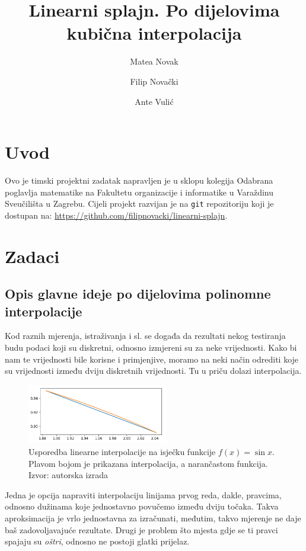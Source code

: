 \documentclass[12pt,a4paper]{report}
\author{Matea Novak \and Filip Novački \and Ante Vulić}
\title{Linearni splajn. Po dijelovima kubična interpolacija}
\begin{document}
	\maketitle
	
	\tableofcontents
	
\chapter{Uvod}
	Ovo je timski projektni zadatak napravljen je u sklopu kolegija Odabrana poglavlja matematike na Fakultetu organizacije i informatike u Varaždinu Sveučilišta u Zagrebu. Cijeli projekt razvijan je na \texttt{git} repozitoriju koji je dostupan na: \url{https://github.com/filipnovacki/linearni-splajn}. 
\chapter{Zadaci}
	\section{Opis glavne ideje po dijelovima polinomne interpolacije}
	Kod raznih mjerenja, istraživanja i sl. se događa da rezultati nekog testiranja budu podaci koji su diskretni, odnosno izmjereni su za neke vrijednosti. Kako bi nam te vrijednosti bile korisne i primjenjive, moramo na neki način odrediti koje su vrijednosti između dviju diskretnih vrijednosti. Tu u priču dolazi interpolacija.
	
	\begin{figure}
		\includegraphics[width=0.55\textwidth]{slike/usporedba.png}
		\caption{Usporedba linearne interpolacije na isječku funkcije $f(x)=\sin x$. Plavom bojom je prikazana interpolacija, a narančastom funkcija. Izvor: autorska izrada}
		\label{usporedba}
	\end{figure}
	
	Jedna je opcija napraviti interpolaciju linijama prvog reda, dakle, pravcima, odnosno dužinama koje jednostavno povučemo između dviju točaka. Takva aproksimacija je vrlo jednostavna za izračunati, međutim, takvo mjerenje ne daje baš zadovoljavajuće rezultate. Drugi je problem što mjesta gdje se ti pravci spajaju su \textit{oštri}, odnosno ne postoji glatki prijelaz.
	
\end{document}
